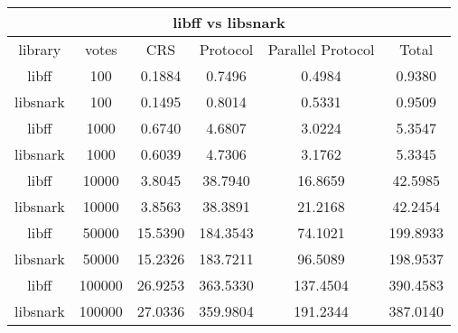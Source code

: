 \documentclass{standalone}
\begin{document}
\begin{tabular}{| c | c | c | c | c | c |}
    \hline
    \multicolumn{6}{|c|}{libff vs libsnark}\\
    \hline
    library & votes & CRS & Protocol & Parallel Protocol & Total\\ \hline
    libff & 100 & 0.1884 & 0.7496 & 0.4984 & 0.9380 \\ \hline
    libsnark & 100 & 0.1495 & 0.8014 & 0.5331 & 0.9509 \\ \hline
    libff & 1000 & 0.6740 & 4.6807 & 3.0224 & 5.3547\\ \hline
    libsnark & 1000 & 0.6039 & 4.7306 & 3.1762 & 5.3345 \\ \hline
    libff & 10000 & 3.8045 & 38.7940 & 16.8659 & 42.5985\\ \hline
    libsnark & 10000 & 3.8563 & 38.3891 & 21.2168 & 42.2454 \\ \hline
    libff & 50000 & 15.5390 & 184.3543 & 74.1021 & 199.8933\\ \hline
    libsnark & 50000 & 15.2326 & 183.7211 & 96.5089 & 198.9537\\ \hline
    libff & 100000 & 26.9253& 363.5330 & 137.4504  & 390.4583 \\ \hline %
    libsnark & 100000 & 27.0336 & 359.9804 & 191.2344 & 387.0140\\      %
    \hline
\end{tabular}
\end{document}
